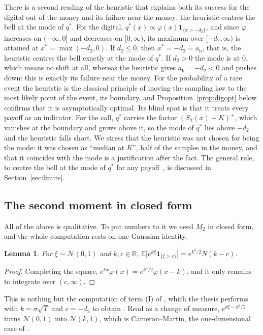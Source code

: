 \documentclass[11pt,a4paper]{article}
\theoremstyle{plain}
\newtheorem{lemma}[theorem]{Lemma}
\theoremstyle{definition}
\theoremstyle{remark}
\newcommand{\R}{\mathbb{R}}
\newcommand{\E}{\mathbb{E}}
\newcommand{\1}{\mathbf{1}}
\begin{document}
There is a second reading of the heuristic that explains both its success for the digital out of the money and its failure near the money: the heuristic centres the bell at the mode of $q^*$. For the digital, $q^*(x) \propto \varphi(x)\1_{\{x > -d_2\}}$, and since $\varphi$ increases on $(-\infty, 0]$ and decreases on $[0, \infty)$, its maximum over $[-d_2, \infty)$ is attained at $x^* = \max(-d_2, 0)$. If $d_2 \le 0$, then $x^* = -d_2 = a_{\mathrm h}$, that is, the heuristic centres the bell exactly at the mode of $q^*$. If $d_2 > 0$ the mode is at $0$, which means no shift at all, whereas the heuristic gives $a_{\mathrm h} = -d_2 < 0$ and pushes down: this is exactly its failure near the money. For the probability of a rare event the heuristic is the classical principle of moving the sampling law to the most likely point of the event, its boundary, and Proposition~\ref{prop:digopt} below confirms that it is asymptotically optimal. Its blind spot is that it treats every payoff as an indicator. For the call, $q^*$ carries the factor $(S_T(x) - K)^+$, which vanishes at the boundary and grows above it, so the mode of $q^*$ lies above $-d_2$ and the heuristic falls short. We stress that the heuristic was not chosen for being the mode: it was chosen as ``median at $K$'', half of the samples in the money, and that it coincides with the mode is a justification after the fact. The general rule, to centre the bell at the mode of $q^*$ for any payoff~\cite[\S 4.6.2]{glasserman}, is discussed in Section~\ref{sec:limits}.

\subsection{The second moment in closed form}

All of the above is qualitative. To put numbers to it we need $M_2$ in closed form, and the whole computation rests on one Gaussian identity.

\begin{lemma}\label{lem:gauss}
For $\xi \sim \mathcal N(0,1)$ and $k, c \in \R$, $\E\bigl[e^{k\xi}\1_{\{\xi > c\}}\bigr] = e^{k^2/2}N(k - c)$.
\end{lemma}

\begin{proof}
Completing the square, $e^{kx}\varphi(x) = e^{k^2/2}\varphi(x - k)$, and it only remains to integrate over $(c, \infty)$.
\end{proof}

This is nothing but the computation of term (I) of \cite[(5.25)]{tfg}, which the thesis performs with $k = \sigma\sqrt T$ and $c = -d_2$ to obtain \cite[(5.29)]{tfg}. Read as a change of measure, $e^{k\xi - k^2/2}$ turns $\mathcal N(0,1)$ into $\mathcal N(k,1)$, which is Cameron--Martin, the one-dimensional case of \cite[Thm~4.20]{tfg}.
\end{document}
